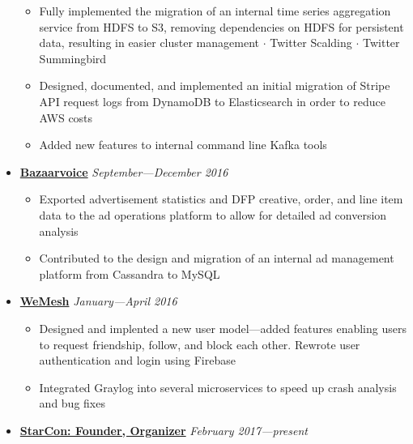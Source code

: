\documentclass[5pt,letterpaper]{article}
\newcommand{\dt}{$\cdot$ }
\begin{document}
\begin{itemize}[leftmargin=1em, noitemsep]
    \begin{itemize}[label=\textbullet, noitemsep, nosep]
      \item Fully implemented the migration of an internal time series aggregation service
        from HDFS to S3, removing dependencies on HDFS for persistent data, resulting in easier cluster
        management \dt Twitter Scalding \dt Twitter Summingbird
      \item Designed, documented, and implemented an initial migration of Stripe
        API request logs from DynamoDB to Elasticsearch in order to reduce AWS
        costs
      \item Added new features to internal command line Kafka tools
    \end{itemize}

  \item[]
    {\href{http://www.bazaarvoice.com}{\textbf{Bazaarvoice}} \hfill
    \emph{September---December 2016}}

    \begin{itemize}[label=\textbullet, noitemsep, nosep]
      \item Exported advertisement statistics and DFP creative, order, and line
        item data to the ad operations platform to allow for detailed ad
        conversion analysis
      \item Contributed to the design and migration of an internal ad
        management platform from Cassandra to MySQL
    \end{itemize}

  \item[]
    {\href{http://www.rave.io}{\textbf{WeMesh}} \hfill
    \emph{January---April 2016}}

    \begin{itemize}[label=\textbullet, noitemsep, nosep]
      \item Designed and implented a new user model---added features enabling
        users to request friendship, follow, and block each other. Rewrote user
        authentication and login using Firebase
      \item Integrated Graylog into several microservices to speed up crash
        analysis and bug fixes
    \end{itemize}

  \item[]
    {\href{https://starcon.io}{\textbf{StarCon: Founder, Organizer}} \hfill
    \emph{February 2017---present}}
    

\end{itemize}
\end{document}
